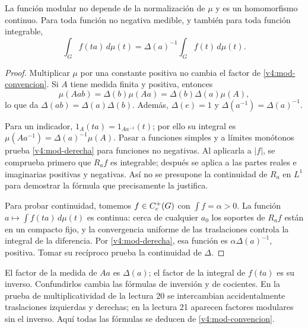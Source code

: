\begin{proposicion}\label{v4:mod-prop}
La función modular no depende de la normalización de $\mu$ y es un homomorfismo continuo. Para toda función no negativa medible, y también para toda función integrable,
\begin{equation}\label{v4:mod-derecha}
 \int_G f(ta)\,d\mu(t)=\Delta(a)^{-1}\int_G f(t)\,d\mu(t).
\end{equation}
\end{proposicion}
\begin{proof}
Multiplicar $\mu$ por una constante positiva no cambia el factor de \eqref{v4:mod-convencion}. Si $A$ tiene medida finita y positiva, entonces
\[
 \mu(Aab)=\Delta(b)\mu(Aa)=\Delta(b)\Delta(a)\mu(A),
\]
lo que da $\Delta(ab)=\Delta(a)\Delta(b)$. Además, $\Delta(e)=1$ y $\Delta(a^{-1})=\Delta(a)^{-1}$.

Para un indicador, $1_A(ta)=1_{Aa^{-1}}(t)$; por ello su integral es $\mu(Aa^{-1})=\Delta(a)^{-1}\mu(A)$. Pasar a funciones simples y a límites monótonos prueba \eqref{v4:mod-derecha} para funciones no negativas. Al aplicarla a $|f|$, se comprueba primero que $R_af$ es integrable; después se aplica a las partes reales e imaginarias positivas y negativas. Así no se presupone la continuidad de $R_a$ en $L^1$ para demostrar la fórmula que precisamente la justifica.

Para probar continuidad, tomemos $f\in C_c^+(G)$ con $\int f=\alpha>0$. La función $a\mapsto\int f(ta)\,d\mu(t)$ es continua: cerca de cualquier $a_0$ los soportes de $R_af$ están en un compacto fijo, y la convergencia uniforme de las traslaciones controla la integral de la diferencia. Por \eqref{v4:mod-derecha}, esa función es $\alpha\Delta(a)^{-1}$, positiva. Tomar su recíproco prueba la continuidad de $\Delta$.
\end{proof}
\begin{observacion}
El factor de la medida de $Aa$ es $\Delta(a)$; el factor de la integral de $f(ta)$ es su inverso. Confundirlos cambia las fórmulas de inversión y de cocientes. En la prueba de multiplicatividad de la lectura 20 se intercambian accidentalmente traslaciones izquierdas y derechas; en la lectura 21 aparecen factores modulares sin el inverso. Aquí todas las fórmulas se deducen de \eqref{v4:mod-convencion}.
\end{observacion}

